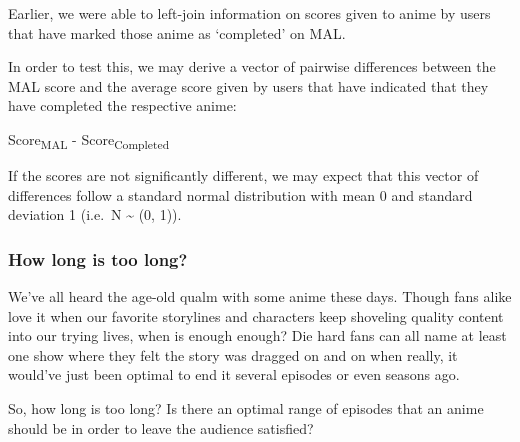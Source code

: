 \documentclass[
]{article}
\begin{document}
Earlier, we were able to left-join information on scores given to anime
by users that have marked those anime as `completed' on MAL.

In order to test this, we may derive a vector of pairwise differences
between the MAL score and the average score given by users that have
indicated that they have completed the respective anime:

Score\textsubscript{MAL} - Score\textsubscript{Completed}

If the scores are not significantly different, we may expect that this
vector of differences follow a standard normal distribution with mean 0
and standard deviation 1 (i.e.~N \textasciitilde{} (0, 1)).

\hypertarget{how-long-is-too-long}{%
\subsubsection{How long is too long?}\label{how-long-is-too-long}}

We've all heard the age-old qualm with some anime these days. Though
fans alike love it when our favorite storylines and characters keep
shoveling quality content into our trying lives, when is enough enough?
Die hard fans can all name at least one show where they felt the story
was dragged on and on when really, it would've just been optimal to end
it several episodes or even seasons ago.

So, how long is too long? Is there an optimal range of episodes that an
anime should be in order to leave the audience satisfied?
\end{document}
